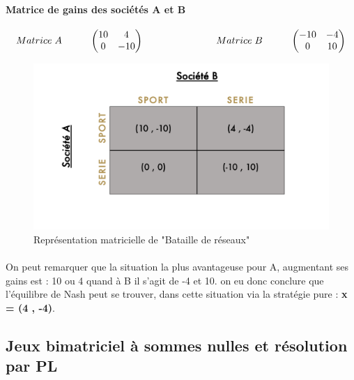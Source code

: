 \documentclass[a4paper, 12pt, twoside]{article}
\begin{document}
{{\paragraph*{Matrice de gains des sociétés A et B}
\[
Matrice\hspace{0,1cm} A\hspace{1cm}
\begin{pmatrix}10&4\\
0&-10\\
\end{pmatrix}\                      \hspace{2,5cm}  
Matrice\hspace{0,1cm} B \hspace{1cm}  
\begin{pmatrix}-10&-4\\
0&10\\
\end{pmatrix} 
\]

\begin{figure}[h]
\centering
\includegraphics[scale=0.4]{Matching2.pdf}
\caption{Représentation matricielle de "Bataille de réseaux"}
\end{figure}

\paragraph*{}{On peut remarquer que la situation la plus avantageuse pour A, augmentant ses gains est : 10 ou 4 quand à B il s'agit de -4 et 10.  on eu donc conclure que l'équilibre de Nash peut se trouver, dans cette situation via la stratégie pure :
\textbf{x = (4 , -4)}}.


\subsection{Jeux bimatriciel à sommes nulles et résolution par PL}

}}
\end{document}
